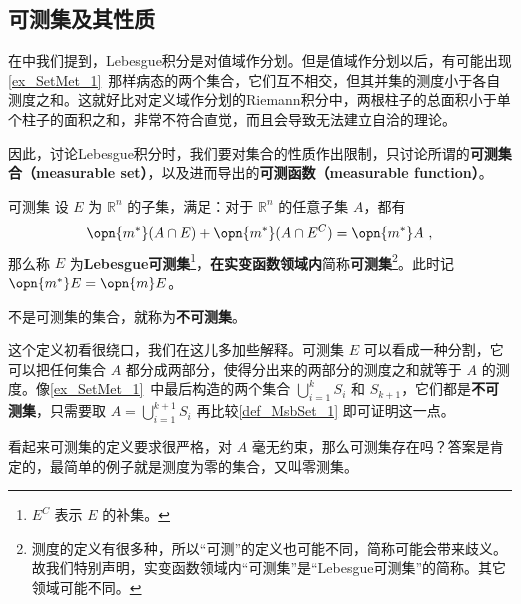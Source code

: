 

\subsection{可测集及其性质}

在中我们提到，Lebesgue积分是对值域作分划。但是值域作分划以后，有可能出现\autoref{ex_SetMet_1}~那样病态的两个集合，它们互不相交，但其并集的测度小于各自测度之和。这就好比对定义域作分划的Riemann积分中，两根柱子的总面积小于单个柱子的面积之和，非常不符合直觉，而且会导致无法建立自洽的理论。

因此，讨论Lebesgue积分时，我们要对集合的性质作出限制，只讨论所谓的\textbf{可测集合（measurable set）}，以及进而导出的\textbf{可测函数（measurable function）}。

\begin{definition}{可测集}\label{def_MsbSet_1}
设 $E$ 为 $\mathbb{R}^n$ 的子集，满足：对于 $\mathbb{R}^n$ 的任意子集 $A$，都有
\begin{equation}
\opn{m^*}(A\cap E)+\opn{m^*}(A\cap E^C)=\opn{m^*}A~,
\end{equation}
那么称 $E$ 为\textbf{Lebesgue可测集}\footnote{$E^C$ 表示 $E$ 的补集。}，\textbf{在实变函数领域内}简称\textbf{可测集}\footnote{测度的定义有很多种，所以“可测”的定义也可能不同，简称可能会带来歧义。故我们特别声明，实变函数领域内“可测集”是“Lebesgue可测集”的简称。其它领域可能不同。}。此时记 $\opn{m^*}E=\opn{m}E$。

不是可测集的集合，就称为\textbf{不可测集}。

\end{definition}

这个定义初看很绕口，我们在这儿多加些解释。可测集 $E$ 可以看成一种分割，它可以把任何集合 $A$ 都分成两部分，使得分出来的两部分的测度之和就等于 $A$ 的测度。像\autoref{ex_SetMet_1}~中最后构造的两个集合 $\bigcup_{i=1}^k S_i$ 和 $S_{k+1}$，它们都是\textbf{不可测集}，只需要取 $A=\bigcup^{k+1}_{i=1} S_i$ 再比较\autoref{def_MsbSet_1} 即可证明这一点。

看起来可测集的定义要求很严格，对 $A$ 毫无约束，那么可测集存在吗？答案是肯定的，最简单的例子就是测度为零的集合，又叫零测集。

